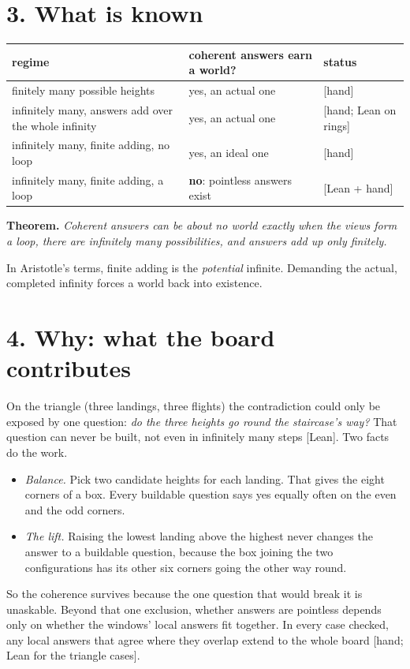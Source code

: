 \documentclass[11pt]{article}
\newcommand{\st}[1]{\textsf{\small[#1]}}
\begin{document}
\section*{3. What is known}
\begin{center}\small
\begin{tabular}{|>{\raggedright\arraybackslash}p{6.4cm}|>{\raggedright\arraybackslash}p{4.4cm}|>{\raggedright\arraybackslash}p{2.6cm}|}
\hline
\textbf{regime} & \textbf{coherent answers earn a world?} & \textbf{status}\\\hline
finitely many possible heights & yes, an actual one & \st{hand}\\
infinitely many, answers add over the whole infinity & yes, an actual one & \st{hand; Lean on rings}\\
infinitely many, finite adding, no loop & yes, an ideal one & \st{hand}\\
infinitely many, finite adding, a loop & \textbf{no}: pointless answers exist & \st{Lean + hand}\\\hline
\end{tabular}
\end{center}

\noindent\textbf{Theorem.} \emph{Coherent answers can be about no world exactly
when the views form a loop, there are infinitely many possibilities, and answers
add up only finitely.}

\medskip
\noindent In Aristotle's terms, finite adding is the \emph{potential} infinite.
Demanding the actual, completed infinity forces a world back into existence.

\section*{4. Why: what the board contributes}
On the triangle (three landings, three flights) the contradiction could only be
exposed by one question: \emph{do the three heights go round the staircase's
way?} That question can never be built, not even in infinitely many steps
\st{Lean}. Two facts do the work.
\begin{itemize}[nosep]
  \item \emph{Balance.} Pick two candidate heights for each landing. That gives
    the eight corners of a box. Every buildable question says yes equally often
    on the even and the odd corners.
  \item \emph{The lift.} Raising the lowest landing above the highest never
    changes the answer to a buildable question, because the box joining the two
    configurations has its other six corners going the other way round.
\end{itemize}
So the coherence survives because the one question that would break it is
unaskable. Beyond that one exclusion, whether answers are pointless depends only
on whether the windows' local answers fit together. In every case checked, any
local answers that agree where they overlap extend to the whole board
\st{hand; Lean for the triangle cases}.
\end{document}
